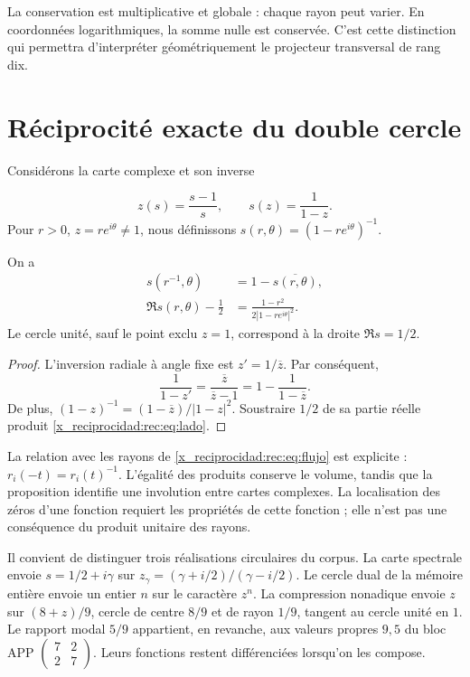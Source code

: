 La conservation est multiplicative et globale : chaque rayon peut varier. En coordonnées logarithmiques, la somme nulle est conservée. C'est cette distinction qui permettra d'interpréter géométriquement le projecteur transversal de rang dix.

\section{Réciprocité exacte du double cercle}
\label{x_reciprocidad:rec:doble-circulo}

Considérons la carte complexe et son inverse

\[
 z(s)=\frac{s-1}{s},\qquad s(z)=\frac1{1-z}.
\]
Pour \(r>0\), \(z=re^{i\theta}\ne1\), nous définissons \(s(r,\theta)=(1-re^{i\theta})^{-1}\).

\begin{proposition}
\label{x_reciprocidad:rec:prop:espejo}
On a
\begin{align}
 s(r^{-1},\theta)&=1-\overline{s(r,\theta)},\label{x_reciprocidad:rec:eq:espejo}\\
 \Re s(r,\theta)-\frac12&=
 \frac{1-r^2}{2|1-re^{i\theta}|^2}.\label{x_reciprocidad:rec:eq:lado}
\end{align}
Le cercle unité, sauf le point exclu \(z=1\), correspond à la droite \(\Re s=1/2\).
\end{proposition}
\begin{proof}
L’inversion radiale à angle fixe est \(z'=1/\overline z\). Par conséquent,
\[
 \frac1{1-z'}=\frac{\overline z}{\overline z-1}
 =1-\frac1{1-\overline z}.
\]
De plus, \((1-z)^{-1}=(1-\overline z)/|1-z|^2\). Soustraire \(1/2\) de sa partie réelle produit \eqref{x_reciprocidad:rec:eq:lado}.
\end{proof}

La relation avec les rayons de \eqref{x_reciprocidad:rec:eq:flujo} est explicite : \(r_i(-t)=r_i(t)^{-1}\). L’égalité des produits conserve le volume, tandis que la proposition identifie une involution entre cartes complexes. La localisation des zéros d’une fonction requiert les propriétés de cette fonction ; elle n’est pas une conséquence du produit unitaire des rayons.


Il convient de distinguer trois réalisations circulaires du corpus. La carte spectrale envoie \(s=1/2+i\gamma\) sur \(z_\gamma=(\gamma+i/2)/(\gamma-i/2)\). Le cercle dual de la mémoire entière envoie un entier \(n\) sur le caractère \(z^n\). La compression nonadique envoie \(z\) sur \((8+z)/9\), cercle de centre \(8/9\) et de rayon \(1/9\), tangent au cercle unité en \(1\). Le rapport modal \(5/9\) appartient, en revanche, aux valeurs propres \(9,5\) du bloc APP \(\left(\begin{smallmatrix}7&2\\2&7\end{smallmatrix}\right)\). Leurs fonctions restent différenciées lorsqu'on les compose.

